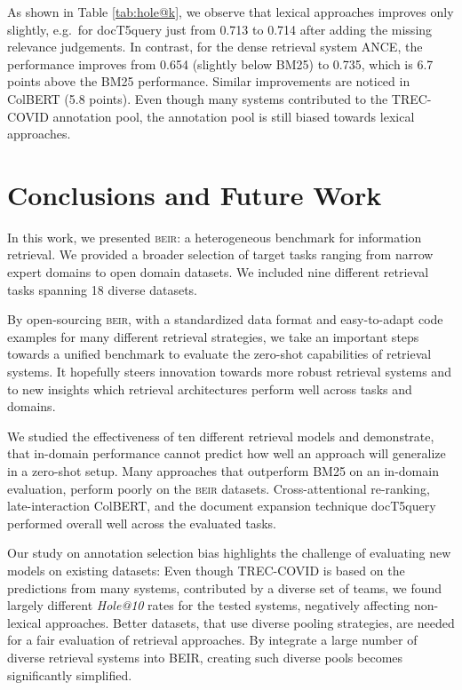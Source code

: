 \documentclass{article}
\newcommand{\custo}[1]{\textsc{\normalsize #1}}
\newcommand{\beir}{\custo{beir}\xspace}
\begin{document}
As shown in Table \ref{tab:hole@k}, we observe that lexical approaches improves only slightly, e.g.\ for docT5query just from 0.713 to 0.714 after adding the missing relevance judgements. In contrast, for the dense retrieval system ANCE, the performance improves from 0.654 (slightly below BM25) to 0.735, which is 6.7 points above the BM25 performance. Similar improvements are noticed in ColBERT (5.8 points). Even though many systems contributed to the TREC-COVID annotation pool, the annotation pool is still biased towards lexical approaches.




\vspace{-3mm}
\section{Conclusions and Future Work}
\vspace{-2mm}

In this work, we presented \beir: a heterogeneous benchmark for information retrieval. We provided a broader selection of target tasks ranging from narrow expert domains to open domain datasets. We included nine different retrieval tasks spanning 18 diverse datasets.  

By open-sourcing \beir, with a standardized data format and easy-to-adapt code examples for many different retrieval strategies, we take an important steps towards a unified benchmark to evaluate the zero-shot capabilities of retrieval systems. It hopefully steers innovation towards more robust retrieval systems and to new insights which retrieval architectures perform well across tasks and domains. 

We studied the effectiveness of ten different retrieval models and demonstrate, that in-domain performance cannot predict how well an approach will generalize in a zero-shot setup. Many approaches that outperform BM25 on an in-domain evaluation, perform poorly on the \beir datasets.  Cross-attentional re-ranking, late-interaction ColBERT, and the document expansion technique docT5query performed overall well across the evaluated tasks. 

Our study on annotation selection bias highlights the challenge of evaluating new models on existing datasets: Even though TREC-COVID is based on the predictions from many systems, contributed by a diverse set of teams, we found largely different \textit{Hole@10} rates for the tested systems, negatively affecting non-lexical approaches. Better datasets, that use diverse pooling strategies, are needed for a fair evaluation of retrieval approaches. By integrate a large number of diverse retrieval systems into BEIR, creating such diverse pools becomes significantly simplified.
\end{document}
